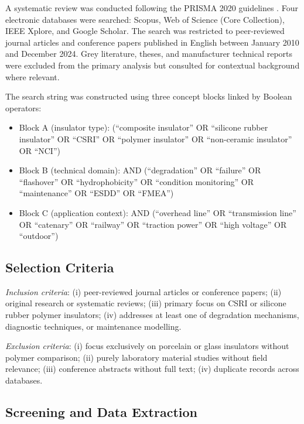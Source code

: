\documentclass[preprint,12pt,3p]{elsarticle}
\begin{document}
A systematic review was conducted following the PRISMA 2020 guidelines
\cite{Page2021}. Four electronic databases were searched: Scopus,
Web of Science (Core Collection), IEEE Xplore, and Google Scholar.
The search was restricted to peer-reviewed journal articles and conference
papers published in English between January 2010 and December 2024.
Grey literature, theses, and manufacturer technical reports were excluded
from the primary analysis but consulted for contextual background where
relevant.

The search string was constructed using three concept blocks linked by
Boolean operators:

\begin{itemize}
  \item Block A (insulator type): (``composite insulator'' OR
    ``silicone rubber insulator'' OR ``CSRI'' OR ``polymer insulator''
    OR ``non-ceramic insulator'' OR ``NCI'')
  \item Block B (technical domain): AND (``degradation'' OR ``failure''
    OR ``flashover'' OR ``hydrophobicity'' OR ``condition monitoring''
    OR ``maintenance'' OR ``ESDD'' OR ``FMEA'')
  \item Block C (application context): AND (``overhead line'' OR
    ``transmission line'' OR ``catenary'' OR ``railway'' OR ``traction
    power'' OR ``high voltage'' OR ``outdoor'')
\end{itemize}

\subsection{Selection Criteria}

\textit{Inclusion criteria}: (i) peer-reviewed journal articles or conference
papers; (ii) original research or systematic reviews; (iii) primary focus on
CSRI or silicone rubber polymer insulators; (iv) addresses at least one of
degradation mechanisms, diagnostic techniques, or maintenance modelling.

\textit{Exclusion criteria}: (i) focus exclusively on porcelain or glass
insulators without polymer comparison; (ii) purely laboratory material
studies without field relevance; (iii) conference abstracts without full text;
(iv) duplicate records across databases.

\subsection{Screening and Data Extraction}
\end{document}
